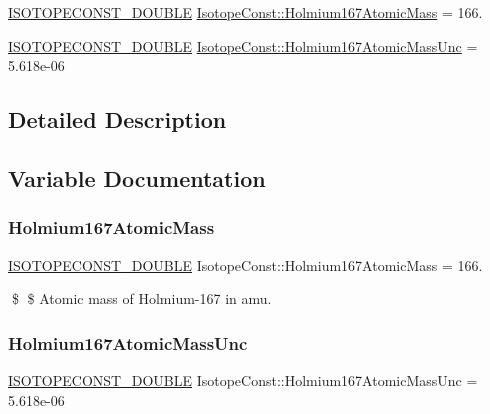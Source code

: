 \begin{DoxyCompactItemize}
\item 
\mbox{\hyperlink{group___isotope_const-_macros_ga8f45a7272ce02c0b4c65c44636ed719a}{I\+S\+O\+T\+O\+P\+E\+C\+O\+N\+S\+T\+\_\+\+D\+O\+U\+B\+LE}} \mbox{\hyperlink{group___isotope_const-_holmium-_ho167_ga08b68a16acab337a94d904f665b8a94a}{Isotope\+Const\+::\+Holmium167\+Atomic\+Mass}} = 166.
\item 
\mbox{\hyperlink{group___isotope_const-_macros_ga8f45a7272ce02c0b4c65c44636ed719a}{I\+S\+O\+T\+O\+P\+E\+C\+O\+N\+S\+T\+\_\+\+D\+O\+U\+B\+LE}} \mbox{\hyperlink{group___isotope_const-_holmium-_ho167_ga13be96b90aebf0c7722af60e5de9c8e9}{Isotope\+Const\+::\+Holmium167\+Atomic\+Mass\+Unc}} = 5.\+618e-\/06
\end{DoxyCompactItemize}


\subsection{Detailed Description}


\subsection{Variable Documentation}
\mbox{\label{group___isotope_const-_holmium-_ho167_ga08b68a16acab337a94d904f665b8a94a}} 
\subsubsection{\texorpdfstring{Holmium167\+Atomic\+Mass}{Holmium167AtomicMass}}
{\footnotesize\ttfamily \mbox{\hyperlink{group___isotope_const-_macros_ga8f45a7272ce02c0b4c65c44636ed719a}{I\+S\+O\+T\+O\+P\+E\+C\+O\+N\+S\+T\+\_\+\+D\+O\+U\+B\+LE}} Isotope\+Const\+::\+Holmium167\+Atomic\+Mass = 166.}

\$ \$ Atomic mass of Holmium-\/167 in amu. \mbox{\label{group___isotope_const-_holmium-_ho167_ga13be96b90aebf0c7722af60e5de9c8e9}} 
\subsubsection{\texorpdfstring{Holmium167\+Atomic\+Mass\+Unc}{Holmium167AtomicMassUnc}}
{\footnotesize\ttfamily \mbox{\hyperlink{group___isotope_const-_macros_ga8f45a7272ce02c0b4c65c44636ed719a}{I\+S\+O\+T\+O\+P\+E\+C\+O\+N\+S\+T\+\_\+\+D\+O\+U\+B\+LE}} Isotope\+Const\+::\+Holmium167\+Atomic\+Mass\+Unc = 5.\+618e-\/06}

